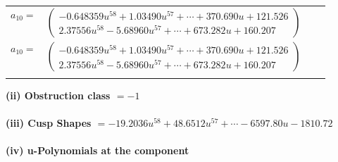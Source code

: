 \documentclass[1p]{elsarticle_modified}
\theoremstyle{definition}
\begin{document}
\begin{tabular}{m{7pt} m{180pt} m{7pt} m{180pt} }
\flushright $a_{10}=$&$\begin{pmatrix}-0.648359 u^{58}+1.03490 u^{57}+\cdots+370.690 u+121.526\\2.37556 u^{58}-5.68960 u^{57}+\cdots+673.282 u+160.207\end{pmatrix}$\\ \flushright $a_{10}=$&$\begin{pmatrix}-0.648359 u^{58}+1.03490 u^{57}+\cdots+370.690 u+121.526\\2.37556 u^{58}-5.68960 u^{57}+\cdots+673.282 u+160.207\end{pmatrix}$\\&\end{tabular}
\flushleft \textbf{(ii) Obstruction class $= -1$}\\~\\
\flushleft \textbf{(iii) Cusp Shapes $= -19.2036 u^{58}+48.6512 u^{57}+\cdots-6597.80 u-1810.72$}\\~\\
\newpage\renewcommand{\arraystretch}{1}
\flushleft \textbf{(iv) u-Polynomials at the component}\newline \\
\end{document}

